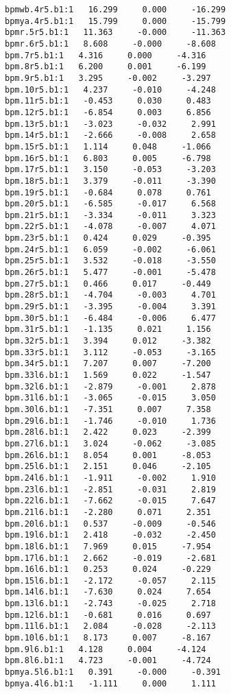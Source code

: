 \begin{verbatim}
bpmwb.4r5.b1:1   16.299     0.000     -16.299
bpmya.4r5.b1:1   15.799     0.000     -15.799
bpmr.5r5.b1:1   11.363     -0.000     -11.363
bpmr.6r5.b1:1   8.608     -0.000     -8.608
bpm.7r5.b1:1   4.316     0.000     -4.316
bpm.8r5.b1:1   6.200     0.001     -6.199
bpm.9r5.b1:1   3.295     -0.002     -3.297
bpm.10r5.b1:1   4.237     -0.010     -4.248
bpm.11r5.b1:1   -0.453     0.030     0.483
bpm.12r5.b1:1   -6.854     0.003     6.856
bpm.13r5.b1:1   -3.023     -0.032     2.991
bpm.14r5.b1:1   -2.666     -0.008     2.658
bpm.15r5.b1:1   1.114     0.048     -1.066
bpm.16r5.b1:1   6.803     0.005     -6.798
bpm.17r5.b1:1   3.150     -0.053     -3.203
bpm.18r5.b1:1   3.379     -0.011     -3.390
bpm.19r5.b1:1   -0.684     0.078     0.761
bpm.20r5.b1:1   -6.585     -0.017     6.568
bpm.21r5.b1:1   -3.334     -0.011     3.323
bpm.22r5.b1:1   -4.078     -0.007     4.071
bpm.23r5.b1:1   0.424     0.029     -0.395
bpm.24r5.b1:1   6.059     -0.002     -6.061
bpm.25r5.b1:1   3.532     -0.018     -3.550
bpm.26r5.b1:1   5.477     -0.001     -5.478
bpm.27r5.b1:1   0.466     0.017     -0.449
bpm.28r5.b1:1   -4.704     -0.003     4.701
bpm.29r5.b1:1   -3.395     -0.004     3.391
bpm.30r5.b1:1   -6.484     -0.006     6.477
bpm.31r5.b1:1   -1.135     0.021     1.156
bpm.32r5.b1:1   3.394     0.012     -3.382
bpm.33r5.b1:1   3.112     -0.053     -3.165
bpm.34r5.b1:1   7.207     0.007     -7.200
bpm.33l6.b1:1   1.569     0.022     -1.547
bpm.32l6.b1:1   -2.879     -0.001     2.878
bpm.31l6.b1:1   -3.065     -0.015     3.050
bpm.30l6.b1:1   -7.351     0.007     7.358
bpm.29l6.b1:1   -1.746     -0.010     1.736
bpm.28l6.b1:1   2.422     0.023     -2.399
bpm.27l6.b1:1   3.024     -0.062     -3.085
bpm.26l6.b1:1   8.054     0.001     -8.053
bpm.25l6.b1:1   2.151     0.046     -2.105
bpm.24l6.b1:1   -1.911     -0.002     1.910
bpm.23l6.b1:1   -2.851     -0.031     2.819
bpm.22l6.b1:1   -7.662     -0.015     7.647
bpm.21l6.b1:1   -2.280     0.071     2.351
bpm.20l6.b1:1   0.537     -0.009     -0.546
bpm.19l6.b1:1   2.418     -0.032     -2.450
bpm.18l6.b1:1   7.969     0.015     -7.954
bpm.17l6.b1:1   2.662     -0.019     -2.681
bpm.16l6.b1:1   0.253     0.024     -0.229
bpm.15l6.b1:1   -2.172     -0.057     2.115
bpm.14l6.b1:1   -7.630     0.024     7.654
bpm.13l6.b1:1   -2.743     -0.025     2.718
bpm.12l6.b1:1   -0.681     0.016     0.697
bpm.11l6.b1:1   2.084     -0.028     -2.113
bpm.10l6.b1:1   8.173     0.007     -8.167
bpm.9l6.b1:1   4.128     0.004     -4.124
bpm.8l6.b1:1   4.723     -0.001     -4.724
bpmya.5l6.b1:1   0.391     -0.000     -0.391
bpmya.4l6.b1:1   -1.111     0.000     1.111

\end{verbatim}
